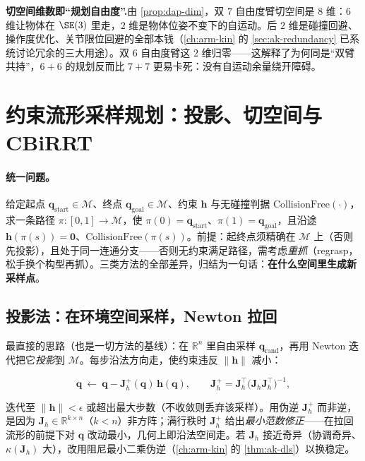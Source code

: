 \begin{note}
\textbf{切空间维数即“规划自由度”.}\;由 \cref{prop:dap-dim}，双 $7$ 自由度臂切空间是 $8$ 维：$6$ 维让物体在 $\SE(3)$ 里走，$2$ 维是物体位姿不变下的自运动。后 $2$ 维是碰撞回避、操作度优化、关节限位回避的全部本钱（\cref{ch:arm-kin} 的 \cref{sec:ak-redundancy} 已系统讨论冗余的三大用途）。双 $6$ 自由度臂这 $2$ 维归零——这解释了为何同是“双臂共持”，$6+6$ 的规划反而比 $7+7$ 更易卡死：没有自运动余量绕开障碍。
\end{note}

\section{约束流形采样规划：投影、切空间与 CBiRRT}
\label{sec:dap-sampling}

\paragraph{统一问题。}
给定起点 $\mathbf{q}_{\text{start}}\in\mathcal{M}$、终点 $\mathbf{q}_{\text{goal}}\in\mathcal{M}$、约束 $\mathbf{h}$ 与无碰撞判据 $\mathrm{CollisionFree}(\cdot)$，求一条路径 $\pi:[0,1]\to\mathcal{M}$，使 $\pi(0)=\mathbf{q}_{\text{start}}$、$\pi(1)=\mathbf{q}_{\text{goal}}$，且沿途 $\mathbf{h}(\pi(s))=\mathbf{0}$、$\mathrm{CollisionFree}(\pi(s))$。前提：起终点须精确在 $\mathcal{M}$ 上（否则先投影），且处于同一连通分支——否则无约束满足路径，需考虑\emph{重抓}（regrasp，松手换个构型再抓）。三类方法的全部差异，归结为一句话：\textbf{在什么空间里生成新采样点}。

\subsection{投影法：在环境空间采样，Newton 拉回}
\label{subsec:dap-projection}

最直接的思路（也是一切方法的基线）：在 $\mathbb{R}^n$ 里自由采样 $\mathbf{q}_{\text{rand}}$，再用 Newton 迭代把它\emph{投影}到 $\mathcal{M}$。每步沿法方向走，使约束违反 $\|\mathbf{h}\|$ 减小：

\begin{equation}
  \mathbf{q}\ \leftarrow\ \mathbf{q}-\mathbf{J}_h^{+}(\mathbf{q})\,\mathbf{h}(\mathbf{q}),\qquad \mathbf{J}_h^{+}=\mathbf{J}_h^\top\big(\mathbf{J}_h\mathbf{J}_h^\top\big)^{-1},
  \label{eq:dap-newton}
\end{equation}

迭代至 $\|\mathbf{h}\|<\epsilon$ 或超出最大步数（不收敛则丢弃该采样）。用伪逆 $\mathbf{J}_h^{+}$ 而非逆，是因为 $\mathbf{J}_h\in\mathbb{R}^{k\times n}$（$k<n$）非方阵；满行秩时 $\mathbf{J}_h^{+}$ 给出\emph{最小范数修正}——在拉回流形的前提下对 $\mathbf{q}$ 改动最小，几何上即沿法空间走。若 $\mathbf{J}_h$ 接近奇异（协调奇异、$\kappa(\mathbf{J}_h)$ 大），改用阻尼最小二乘伪逆（\cref{ch:arm-kin} 的 \cref{thm:ak-dls}）以换稳定。

